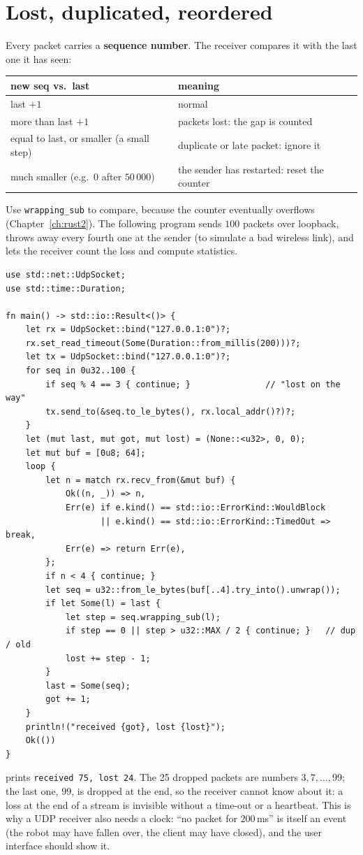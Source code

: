 \section*{Lost, duplicated, reordered}
Every packet carries a \textbf{sequence number}. The receiver compares it with the last one it has seen:
\begin{center}
\renewcommand{\arraystretch}{1.2}
\begin{tabular}{ll}
\textbf{new seq vs.\ last} & \textbf{meaning}\\ \hline
last $+1$ & normal\\
more than last $+1$ & packets lost: the gap is counted\\
equal to last, or smaller (a small step) & duplicate or late packet: ignore it\\
much smaller (e.g.\ $0$ after $50\,000$) & the sender has restarted: reset the counter\\
\end{tabular}
\end{center}
Use \verb!wrapping_sub! to compare, because the counter eventually overflows (Chapter~\ref{ch:rust2}). The following program sends $100$ packets over loopback, throws away every fourth one at the sender (to simulate a bad wireless link), and lets the receiver count the loss and compute statistics.
\begin{verbatim}
use std::net::UdpSocket;
use std::time::Duration;

fn main() -> std::io::Result<()> {
    let rx = UdpSocket::bind("127.0.0.1:0")?;
    rx.set_read_timeout(Some(Duration::from_millis(200)))?;
    let tx = UdpSocket::bind("127.0.0.1:0")?;
    for seq in 0u32..100 {
        if seq % 4 == 3 { continue; }               // "lost on the way"
        tx.send_to(&seq.to_le_bytes(), rx.local_addr()?)?;
    }
    let (mut last, mut got, mut lost) = (None::<u32>, 0, 0);
    let mut buf = [0u8; 64];
    loop {
        let n = match rx.recv_from(&mut buf) {
            Ok((n, _)) => n,
            Err(e) if e.kind() == std::io::ErrorKind::WouldBlock
                   || e.kind() == std::io::ErrorKind::TimedOut => break,
            Err(e) => return Err(e),
        };
        if n < 4 { continue; }
        let seq = u32::from_le_bytes(buf[..4].try_into().unwrap());
        if let Some(l) = last {
            let step = seq.wrapping_sub(l);
            if step == 0 || step > u32::MAX / 2 { continue; }   // dup / old
            lost += step - 1;
        }
        last = Some(seq);
        got += 1;
    }
    println!("received {got}, lost {lost}");
    Ok(())
}
\end{verbatim}
prints \verb!received 75, lost 24!. The 25 dropped packets are numbers $3,7,\dots,99$; the last one, $99$, is dropped at the end, so the receiver cannot know about it: a loss at the end of a stream is invisible without a time-out or a heartbeat. This is why a UDP receiver also needs a clock: ``no packet for $200$\,ms'' is itself an event (the robot may have fallen over, the client may have closed), and the user interface should show it.

